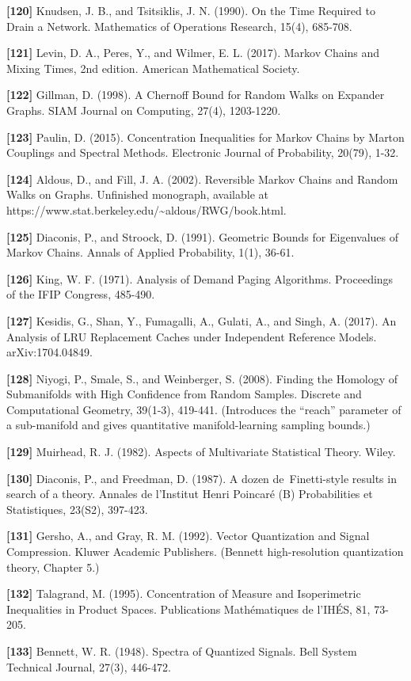 \documentclass[
]{article}
\begin{document}
\textbf{{[}120{]}} Knudsen, J. B., and Tsitsiklis, J. N. (1990).
On the Time Required to Drain a Network. Mathematics of Operations
Research, 15(4), 685-708.

\textbf{{[}121{]}} Levin, D. A., Peres, Y., and Wilmer, E. L. (2017).
Markov Chains and Mixing Times, 2nd edition. American Mathematical
Society.

\textbf{{[}122{]}} Gillman, D. (1998). A Chernoff Bound for Random
Walks on Expander Graphs. SIAM Journal on Computing, 27(4),
1203-1220.

\textbf{{[}123{]}} Paulin, D. (2015). Concentration Inequalities
for Markov Chains by Marton Couplings and Spectral Methods.
Electronic Journal of Probability, 20(79), 1-32.

\textbf{{[}124{]}} Aldous, D., and Fill, J. A. (2002).
Reversible Markov Chains and Random Walks on Graphs.
Unfinished monograph, available at
https://www.stat.berkeley.edu/\textasciitilde aldous/RWG/book.html.

\textbf{{[}125{]}} Diaconis, P., and Stroock, D. (1991). Geometric
Bounds for Eigenvalues of Markov Chains. Annals of Applied
Probability, 1(1), 36-61.

\textbf{{[}126{]}} King, W. F. (1971). Analysis of Demand Paging
Algorithms. Proceedings of the IFIP Congress, 485-490.

\textbf{{[}127{]}} Kesidis, G., Shan, Y., Fumagalli, A., Gulati,
A., and Singh, A. (2017). An Analysis of LRU Replacement Caches
under Independent Reference Models. arXiv:1704.04849.

\textbf{{[}128{]}} Niyogi, P., Smale, S., and Weinberger, S. (2008).
Finding the Homology of Submanifolds with High Confidence from
Random Samples. Discrete and Computational Geometry, 39(1-3),
419-441. (Introduces the ``reach'' parameter of a sub-manifold and
gives quantitative manifold-learning sampling bounds.)

\textbf{{[}129{]}} Muirhead, R. J. (1982). Aspects of Multivariate
Statistical Theory. Wiley.

\textbf{{[}130{]}} Diaconis, P., and Freedman, D. (1987).
A dozen de~Finetti-style results in search of a theory. Annales de
l'Institut Henri Poincar\'e (B) Probabilities et Statistiques, 23(S2),
397-423.

\textbf{{[}131{]}} Gersho, A., and Gray, R. M. (1992). Vector
Quantization and Signal Compression. Kluwer Academic Publishers.
(Bennett high-resolution quantization theory, Chapter 5.)

\textbf{{[}132{]}} Talagrand, M. (1995). Concentration of Measure
and Isoperimetric Inequalities in Product Spaces. Publications
Math\'ematiques de l'IH\'ES, 81, 73-205.

\textbf{{[}133{]}} Bennett, W. R. (1948). Spectra of Quantized
Signals. Bell System Technical Journal, 27(3), 446-472.
\end{document}
